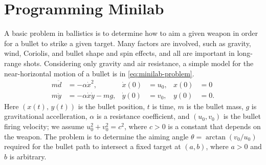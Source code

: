 \documentclass[12pt]{article}
\begin{document}
\section{Programming Minilab}
A basic problem in ballistics is to determine how to aim a given weapon in order
for a bullet to strike a given target. Many factors are involved, such as
gravity, wind, Coriolis, and bullet shape and spin effects, and all are
important in long-range shots. Considering only gravity and air resistance, a
simple model for the near-horizontal motion of a bullet is in
\cref{eq:minilab-problem}.
\begin{equation}
  \label{eq:minilab-problem}
  \begin{aligned}
    m\ddot{d}&=-\alpha\dot{x}^2, & \dot{x}(0)&=u_0, & x(0)&=0 \\
    m\ddot{y}&=-\alpha\dot{x}\dot{y}-mg, & \dot{y}(0)&=v_0, & y(0)&=0.
  \end{aligned}
\end{equation}
Here $(x(t),\,y(t))$ is the bullet position, $t$ is time, $m$ is the bullet
mass, $g$ is gravitational accelleration, $\alpha$ is a resistance coefficient,
and $(u_0,v_0)$ is the bullet firing velocity; we assume $u_0^2+v_0^2=c^2$,
where $c>0$ is a constant that depends on the weapon. The problem is to
determine the aiming angle $\theta = \arctan(v_0/u_0)$ required for the bullet
path to intersect a fixed target at $(a,b)$, where $a>0$ and $b$ is arbitrary.
\end{document}
